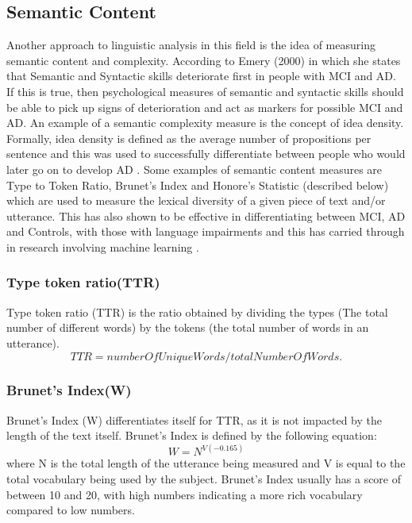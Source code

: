 \documentclass[10pt, letterpaper, twoside, openany]{book}
\begin{document}
\subsection{Semantic Content}
Another approach to linguistic analysis in this field is the idea of measuring semantic content and complexity. According to Emery (2000) \cite{Emery2000} in which she states that Semantic and Syntactic skills deteriorate first in people with MCI and AD. If this is true, then psychological measures of semantic and syntactic skills should be able to pick up signs of deterioration and act as markers for possible MCI and AD. An example of a semantic complexity measure is the concept of idea density. Formally, idea density is defined as the average number of propositions per sentence \cite{Kintsch1973} and this was used to successfully differentiate between people who would later go on to develop AD \cite{Snowdon1996}. Some examples of semantic content measures are Type to Token Ratio, Brunet's Index and Honore's Statistic (described below) which are used to measure the lexical diversity of a given piece of text and/or utterance.  This has also shown to be effective in differentiating between MCI, AD and Controls, with those with language impairments \cite{Bucks2000} and this has carried through in research involving machine learning \cite{Wang2016, Thomas2013}.
\par
\subsubsection{Type token ratio(TTR)}
Type token ratio (TTR) is the ratio obtained by dividing the types (The total number of different words) by the tokens (the total number of words in an utterance).
\begin{equation} \label{x2}
TTR = numberOfUniqueWords / totalNumberOfWords.
\end{equation}
\subsubsection{Brunet's Index(W)} %
Brunet's Index (W) differentiates itself for TTR, as it is not impacted by the length of the text itself. Brunet's Index is defined by the following equation:
\begin{equation} \label{x3}
W = N^{V(-0.165)}
\end{equation}
where N is the total length of the utterance being measured and V is equal to the total vocabulary being used by the subject. Brunet's Index usually has a score of between 10 and 20, with high numbers indicating a more rich vocabulary compared to low numbers. \newline
\par
\end{document}
